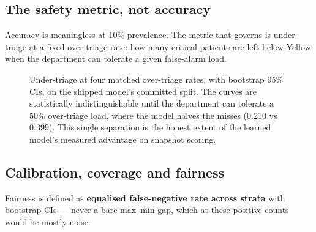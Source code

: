\documentclass[10pt,a4paper,twocolumn]{article}
\begin{document}
\subsection{The safety metric, not accuracy}
Accuracy is meaningless at 10\% prevalence. The metric that governs is under-triage at a fixed
over-triage rate: how many critical patients are left below Yellow when the department can tolerate
a given false-alarm load.

\begin{figure}[t]
\centering
{}
\caption{Under-triage at four matched over-triage rates, with bootstrap 95\% CIs, on the shipped
model's committed split. The curves are statistically indistinguishable until the department can
tolerate a 50\% over-triage load, where the model halves the misses (0.210 vs 0.399). This single
separation is the honest extent of the learned model's measured advantage on snapshot scoring.}
\label{fig:undertriage}
\end{figure}

\subsection{Calibration, coverage and fairness}
Fairness is defined as \textbf{equalised false-negative rate across strata} with bootstrap CIs ---
never a bare max--min gap, which at these positive counts would be mostly noise.
\end{document}
